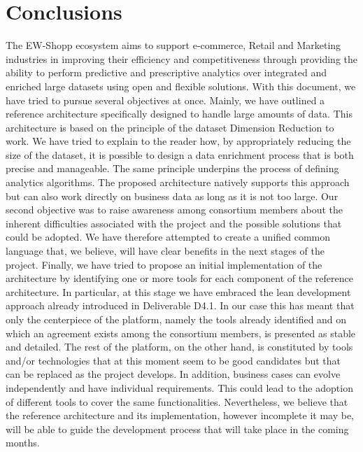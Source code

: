 \section{Conclusions}
The EW-Shopp ecosystem aims to support e-commerce, Retail and Marketing industries in improving their efficiency and competitiveness through providing the ability to perform predictive and prescriptive analytics over integrated and enriched large datasets using open and flexible solutions. 
With this document, we have tried to pursue several objectives at once. Mainly, we have outlined a reference architecture specifically designed to handle large amounts of data. This architecture is based on the principle of the dataset Dimension Reduction to work. We have tried to explain to the reader how, by appropriately reducing the size of the dataset, it is possible to design a data enrichment process that is both precise and manageable. The same principle underpins the process of defining analytics algorithms. The proposed architecture natively supports this approach but can also work directly on business data as long as it is not too large.
Our second objective was to raise awareness among consortium members about the inherent difficulties associated with the project and the possible solutions that could be adopted. We have therefore attempted to create a unified common language that, we believe, will have clear benefits in the next stages of the project.
Finally, we have tried to propose an initial implementation of the architecture by identifying one or more tools for each component of the reference architecture. In particular, at this stage we have embraced the lean development approach already introduced in Deliverable D4.1. In our case this has meant that only the centerpiece of the platform, namely the tools already identified and on which an agreement exists among the consortium members, is presented as stable and detailed. The rest of the platform, on the other hand, is constituted by tools and/or technologies that at this moment seem to be good candidates but that can be replaced as the project develops. In addition, business cases can evolve independently and have individual requirements. This could lead to the adoption of different tools to cover the same functionalities. Nevertheless, we believe that the reference architecture and its implementation, however incomplete it may be, will be able to guide the development process that will take place in the coming months.






